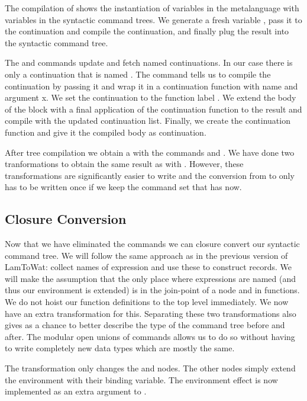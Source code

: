 The compilation of  shows the instantiation of variables in the metalanguage with variables in the syntactic command trees. We generate a fresh variable , pass it to the continuation and compile the continuation, and finally plug the result into the syntactic command tree.

The  and  commands update and fetch named continuations. In our case there is only a continuation that is named . The  command tells us to compile the continuation  by passing it  and wrap it in a continuation function with name  and argument {x}. We set the continuation  to the function label . We extend the body of the block with a final application of the continuation function  to the result  and compile with the updated continuation list. Finally, we create the continuation function and give it the compiled body  as continuation.

After tree compilation we obtain a  with the commands  and . We have done two tranformations to obtain the same result as with . However, these transformations are significantly easier to write and the conversion from  to  only has to be written once if we keep the command set that  has now.

\subsection{\label{subsection:closconvert2}Closure Conversion}
Now that we have eliminated the  commands we can closure convert our syntactic command tree. We will follow the same approach as in the previous version of LamToWat: collect names of expression and use these to construct records. We will make the assumption that the only place where expressions are named (and thus our environment is extended) is in the join-point of a node and in functions. We do not hoist our function definitions to the top level immediately. We now have an extra transformation for this. Separating these two transformations also gives as a chance to better describe the type of the command tree before and after. The modular open unions of commands allows us to do so without having to write completely new data types which are mostly the same.

The transformation only changes the  and  nodes. The other nodes simply extend the environment with their binding variable. The environment effect is now implemented as an extra argument to .

